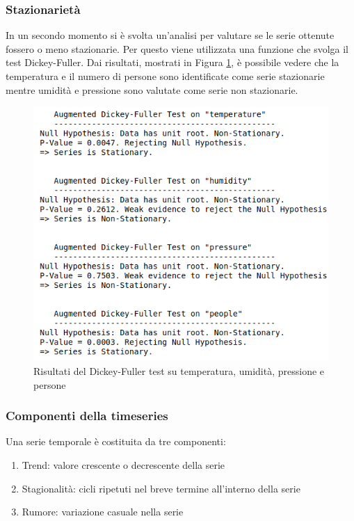 \documentclass{article}
\begin{document}
\subsubsection{Stazionarietà}
In un secondo momento si è svolta un'analisi per valutare se le serie ottenute fossero o meno stazionarie. Per questo viene utilizzata una funzione che svolga il test Dickey-Fuller. Dai risultati, mostrati in Figura \ref{fig:stazionerietà}, è possibile vedere che la temperatura e il numero di persone sono identificate come serie stazionarie mentre umidità e pressione sono valutate come serie non stazionarie.

\begin{figure}
    \centering
    \includegraphics[width=12cm]{img/dickeyFuller.png}
    \caption{Risultati del Dickey-Fuller test su temperatura, umidità, pressione e persone}
    \label{fig:stazionerietà}
\end{figure}

\subsubsection{Componenti della timeseries}
Una serie temporale è costituita da tre componenti:
\begin{enumerate}
    \item Trend: valore crescente o decrescente della serie
    \item Stagionalità: cicli ripetuti nel breve termine all'interno della serie
    \item Rumore: variazione casuale nella serie
\end{enumerate}
\end{document}
